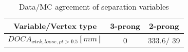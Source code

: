 \documentclass{article}
\begin{document}
\begin{table}[htbp]
\caption{\label{tab:sepVars}Data/MC agreement of separation variables}
\begin{center}
\begin{tabular}{c|c|c}
Variable/Vertex type & 3-prong & 2-prong\\
\hline
$DOCA_{xtrk, loose, pt>0.5} [mm]$ & 0 & 333.6/ 39\\
\hline
\end{tabular}
\end{center}
\end{table}
\end{document}

